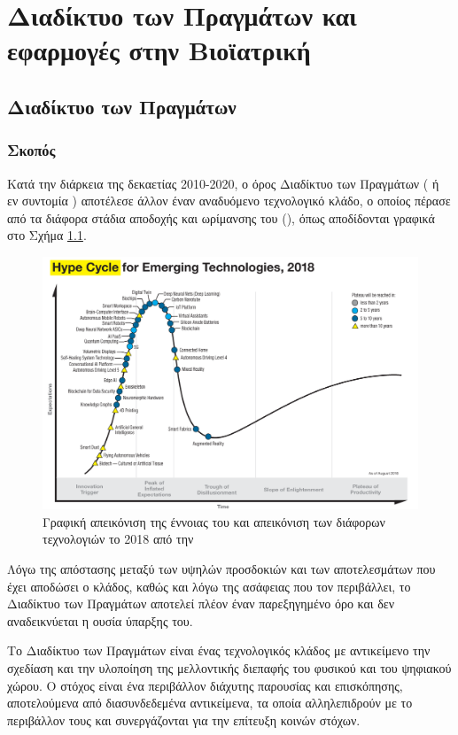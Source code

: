 \chapter{Διαδίκτυο των Πραγμάτων και εφαρμογές στην Βιοϊατρική}
\label{chap1}
\section{Διαδίκτυο των Πραγμάτων}
\subsection{Σκοπός}
Κατά την διάρκεια της δεκαετίας 2010-2020, ο όρος Διαδίκτυο των Πραγμάτων ( ή εν συντομία ) αποτέλεσε άλλον έναν αναδυόμενο τεχνολογικό κλάδο, ο οποίος πέρασε από τα διάφορα στάδια αποδοχής και ωρίμανσης του (), όπως αποδίδονται γραφικά στο Σχήμα \ref{hc}.
\begin{figure}[h!]
\includegraphics[scale=0.3]{images/hype_cycle.png}
\centering
\caption{Γραφική απεικόνιση της έννοιας του  και απεικόνιση των διάφορων τεχνολογιών το 2018 από την  \cite{Gartner:HC}}	
\label{hc}
\end{figure}
Λόγω της απόστασης μεταξύ των υψηλών προσδοκιών και των αποτελεσμάτων που έχει αποδώσει ο κλάδος, καθώς και λόγω της ασάφειας που τον περιβάλλει, το Διαδίκτυο των Πραγμάτων αποτελεί πλέον έναν παρεξηγημένο όρο και δεν αναδεικνύεται η ουσία ύπαρξης του.
\par
Το Διαδίκτυο των Πραγμάτων είναι ένας τεχνολογικός κλάδος με αντικείμενο την σχεδίαση και την υλοποίηση της μελλοντικής διεπαφής του φυσικού και του ψηφιακού χώρου.
Ο στόχος είναι ένα περιβάλλον διάχυτης παρουσίας και επισκόπησης, αποτελούμενα από διασυνδεδεμένα αντικείμενα, τα οποία αλληλεπιδρούν με το περιβάλλον τους και συνεργάζονται για την επίτευξη κοινών στόχων. \cite{book:giusto}
